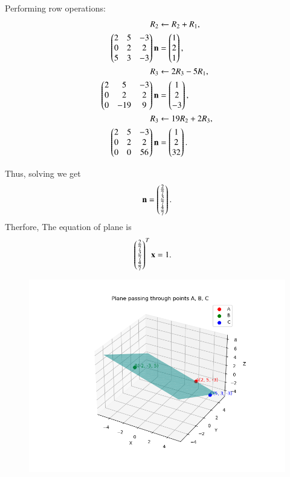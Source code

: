 \documentclass[journal]{IEEEtran}
\begin{document}
Performing row operations:
\begin{align}
R_2 &\leftarrow R_2 + R_1, \\
\begin{pmatrix}2 & 5 & -3 \\ 0 & 2 & 2 \\ 5 & 3 & -3\end{pmatrix}\mathbf{n}
&= \begin{pmatrix}1 \\ 2 \\ 1\end{pmatrix},\\
R_3 &\leftarrow 2R_3 - 5R_1, \\
\begin{pmatrix}2 & 5 & -3 \\ 0 & 2 & 2 \\ 0 & -19 & 9\end{pmatrix}\mathbf{n}
&= \begin{pmatrix}1 \\ 2 \\ -3\end{pmatrix},\\ 
R_3 &\leftarrow 19R_2 + 2R_3, \\
\begin{pmatrix}2 & 5 & -3 \\ 0 & 2 & 2 \\ 0 & 0 & 56\end{pmatrix}\mathbf{n}
&= \begin{pmatrix}1 \\ 2 \\ 32\end{pmatrix}.
\end{align}

Thus, solving we get
\begin{align}
\mathbf{n} = \begin{pmatrix}\tfrac{2}{7} \\ \tfrac{3}{7} \\ \tfrac{4}{7}\end{pmatrix}.
\end{align}
Therfore,
The equation of plane is
\begin{align}
	\begin{pmatrix}\tfrac{2}{7} \\ \tfrac{3}{7} \\ \tfrac{4}{7}\end{pmatrix}^T\mathbf{x} &= 1.
\end{align}
\begin{figure}[h!]
  \centering
   \includegraphics[width=0.7\linewidth]{figs/fig1.png}
   \caption{}
  \label{stemplot}
\end{figure}
\end{document}
